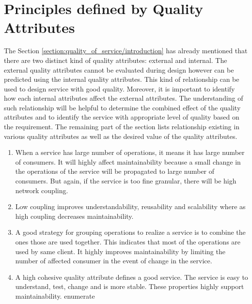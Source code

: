 {{{{{{{{%
\section{Principles defined by Quality Attributes}{\label{section:quality_of_service/quality_attributes_principle}
The Section \ref{section:quality_of_service/introduction} has already mentioned that there are two distinct kind of quality attributes: external and internal. The external quality attributes cannot be evaluated during design however can be predicted using the internal quality attributes. This kind of relationship can be used to design service with good quality. Moreover, it is important to identify how each internal attributes affect the external attributes. The understanding of such relationship will be helpful to determine the combined effect of the quality attributes and to identify the service with appropriate level of quality based on the requirement.
The remaining part of the section lists relationship existing in various quality attributes as well as the desired value of the quality attributes.
\begin{enumerate}
\item When a service has large number of operations, it means it has large number of consumers. It will highly affect maintainability because a small change in the operations of the service will be propagated to large number of consumers. But again, if the service is too fine granular, there will be high network coupling. \cite{Feuerlicht:2007aa, Xiao-jun:2015aa}\cite{Bianco:2007aa}

\item Low coupling improves understandability, reusability and scalability where as high coupling decreases maintainability. \cite{Kazemi:2011aa}\cite{Erl:2005aa}\cite{Josuttis:2007aa}

\item A good strategy for grouping operations to realize a service is to combine the ones those are used together.  This indicates that most of the operations are used by same client.  It highly improves maintainability by limiting the number of affected consumer in the event of change in the service. \cite{Xiao-jun:2015aa}

\item A high cohesive quality attribute defines a good service. The service is easy to understand, test, change and is more stable. These properties highly support maintainability. {enumerate}\cite{np:2001aa}


\end{enumerate}}}}}}}}}}
